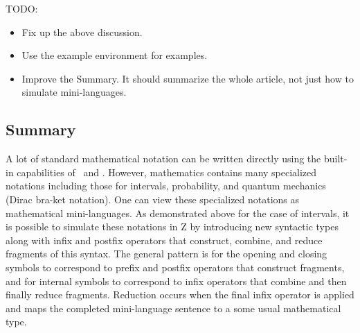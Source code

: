 \documentclass{amsart}
\begin{document}
TODO:
\begin{itemize}
\item Fix up the above discussion.
\item Use the example environment for examples.
\item Improve the Summary. It should summarize the whole article, not just how to simulate mini-languages.
\end{itemize}


\subsection{Summary}

A lot of standard mathematical notation can be written directly using the built-in capabilities of \ZN\  and \fuzz.
However, mathematics contains many specialized notations including those for intervals, probability, and quantum mechanics (Dirac bra-ket notation).
One can view these specialized notations as mathematical mini-languages.
As demonstrated above for the case of intervals, it is possible to simulate these notations in Z by introducing new syntactic types along with infix and postfix operators that construct, combine, and reduce fragments of this syntax.
The general pattern is for the opening and closing symbols to correspond to prefix and postfix operators that
construct fragments, and for internal symbols to correspond to infix operators that combine and then finally 
reduce fragments.
Reduction occurs when the final infix operator is applied and maps the completed mini-language sentence to a 
some usual mathematical type.

\printbibliography
\end{document}
